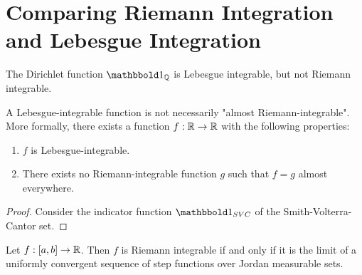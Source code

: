 \section{Comparing Riemann Integration and Lebesgue Integration}
\begin{theorem}
	The Dirichlet function $\boldone_\bQ$ is Lebesgue integrable, but not Riemann integrable.
\end{theorem}
\begin{importanttheorem}{}{}
	A Lebesgue-integrable function is not necessarily "almost Riemann-integrable". More formally, there exists a function $f : \mathbb{R} \to \mathbb{R}$ with the following properties:
	\begin{enumerate}
		\item $f$ is Lebesgue-integrable.
		\item There exists no Riemann-integrable function $g$ such that $f = g$ almost everywhere.
	\end{enumerate}
\end{importanttheorem}
\begin{proof}
	Consider the indicator function $\boldone_{SVC}$ of the Smith-Volterra-Cantor set.
\end{proof}
\begin{importanttheorem}{}{}
	Let $f : [a,b] \to \mathbb{R}$. Then $f$ is Riemann integrable if and only if it is the limit of a uniformly convergent sequence of step functions over Jordan measurable sets.
\end{importanttheorem}

\clearpage

